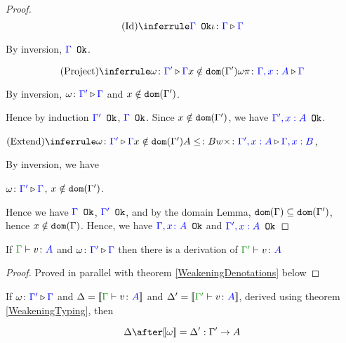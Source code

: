 \documentclass{report}
\begin{document}
\begin{framed}
    \begin{proof}
        
        $$\ntreeruleI{Id}{\ok{\G}}{\wrel{\i}{\G}{\G}}$$
        
        By inversion, ${\color{blue} \Gamma} \texttt{ Ok}$.
        
        $$\ntreeruleII{Project}{\wrel{\w}{\G'}{\G}}{ x \notin \dom{\G'}}{\wrel{\w \pi}{\G, x: A}{\G}}$$
        
        By inversion, $\omega \colon {\color{blue}\Gamma'} \triangleright {\color {blue} \Gamma}$ and $x\notin \texttt{dom}(\Gamma')$.
        
        Hence by induction ${\color{blue} \Gamma'} \texttt{ Ok}$, ${\color{blue} \Gamma} \texttt{ Ok}$. Since $x\notin\texttt{dom}(\Gamma')$, we have ${\color{blue} \Gamma', x:A} \texttt{ Ok}$.
        
        $\ntreeruleIII{Extend}{\wrel{\w}{\G'}{\G}}{ x \notin \dom{\G'}}{ A \subtype B}{\wrel{w \x}{\G', x: A}{\G, x: B}}$, 
        
        By inversion, we have 
        
        $\omega \colon {\color{blue}\Gamma'} \triangleright {\color {blue} \Gamma}$, $x\notin\texttt{dom}(\Gamma')$.
        
        Hence we have ${\color{blue} \Gamma} \texttt{ Ok}$, ${\color{blue} \Gamma'} \texttt{ Ok}$, and by the domain Lemma, $\texttt{dom}(\Gamma)\subseteq\texttt{dom}(\Gamma')$, hence $x\notin\texttt{dom}(\Gamma)$. Hence, we have ${\color{blue} \Gamma, x\colon A} \texttt{ Ok}$ and ${\color{blue} \Gamma',x:A} \texttt{ Ok}$
        
        
    \end{proof}
\end{framed}



\begin{theorem}
    \label{WeakeningTyping}
    If $\gtyperelation{v}{A}$ and $\omega \colon {\color{blue}\Gamma'} \triangleright {\color {blue} \Gamma}$ then there is a derivation of $\typerelation{\G'}{v}{A}$
\end{theorem}

\begin{proof}
    Proved in parallel with theorem \ref{WeakeningDenotations} below
\end{proof}



\begin{theorem}\label{WeakeningDenotations}
    If $\omega \colon {\color{blue}\Gamma'} \triangleright {\color {blue} \Gamma}$ and $\D = \deno{\gtyperelation{v}{A}}$ and $\D' = \deno{\typerelation{\G'}{v}{A}}$, derived using theorem \ref{WeakeningTyping}, then 
    
    $$
        \D \after \deno{\w} = \D' : \G' \rightarrow A
    $$
\end{theorem}
\end{document}
